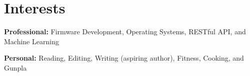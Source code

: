 \documentclass[]{cv-style}          %
\begin{document}




\section{Interests}
  \vspace{-0.2cm}

\textbf{Professional:} Firmware Development, Operating Systems, RESTful API, and Machine Learning

\textbf{Personal:} Reading, Editing, Writing (aspiring author), Fitness, Cooking, and Gunpla

\end{document}
